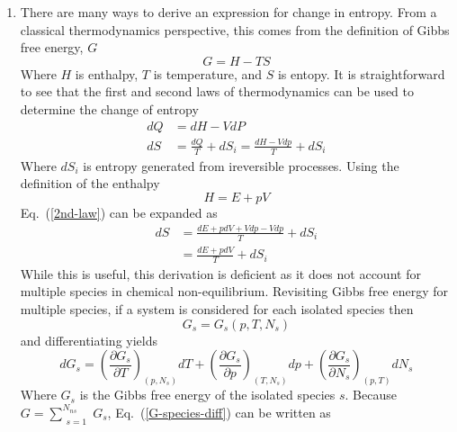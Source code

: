 \documentclass[a4paper]{report}
\newcommand{\eref}[1]{Eq.~(\ref{#1})}
\begin{document}
\begin{enumerate}
  \item There are many ways to derive an expression for change in entropy.  From
    a classical thermodynamics perspective, this comes from the definition of
    Gibbs free energy, $G$
    \begin{equation}
      G = H - TS
      \label{gfe-def}
    \end{equation}
    Where $H$ is enthalpy, $T$ is temperature, and $S$ is entopy.  It is
    straightforward to see that the first and second laws of thermodynamics can
    be used to determine the change of entropy
    \begin{align}
      dQ &= dH - VdP \label{1st-law}\\
      dS &= \frac{dQ}{T} + dS_{i}= \frac{dH - Vdp}{T} + dS_{i}
      \label{2nd-law}
    \end{align}
    Where $dS_i$ is entropy generated from ireversible processes. Using the
    definition of the enthalpy \begin{equation}
      H = E + pV
      \label{enthalpy-def}
    \end{equation}
    \eref{2nd-law} can be expanded as
    \begin{equation}
      \begin{aligned}
	dS &= \frac{dE + pdV + Vdp - Vdp}{T} + dS_i\\
	   &= \frac{dE + pdV}{T} + dS_i
      \end{aligned}
      \label{s-one-gas}
    \end{equation}
    While this is useful, this derivation is deficient as it does not account
    for multiple species in chemical non-equilibrium.  Revisiting Gibbs free
    energy for multiple species, if a system is considered for each isolated
    species then
    \begin{equation}
      G_s = G_s(p,T,N_s)
      \label{G-species-def}
    \end{equation}
    and differentiating yields
    \begin{equation}
      dG_s = \left( \frac{\partial G_s}{\partial T} \right)_{(p,N_s)} dT
      + \left( \frac{\partial G_s}{\partial p} \right)_{(T,N_s)} dp
      + \left( \frac{\partial G_s}{\partial N_s} \right)_{(p,T)} dN_s
      \label{G-species-diff}
    \end{equation}
    Where $G_s$ is the Gibbs free energy of the isolated species $s$. Because 
    $G = \sum\limits_{\substack{s=1}}^{N_{ns}}{G_s}$, \eref{G-species-diff} can
    be written as
    \begin{equation}

\end{equation}
\end{enumerate}
\end{document}
